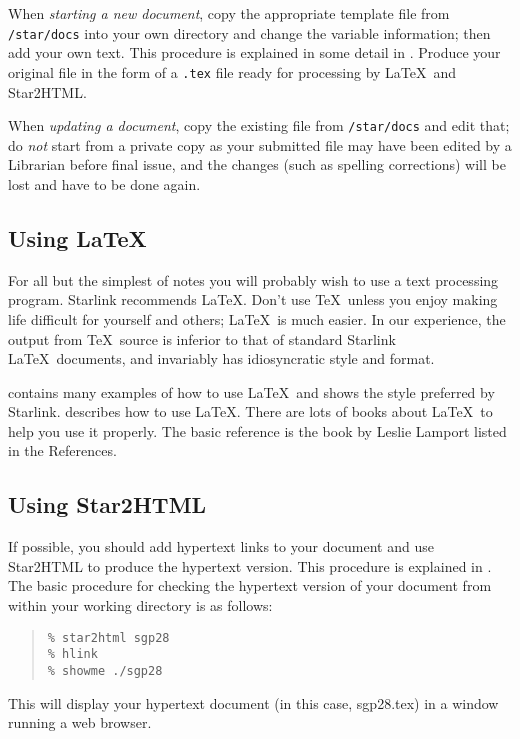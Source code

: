 \documentclass[twoside,11pt,nolof]{starlink}
\begin{document}
When \emph{starting a new document}, copy the appropriate template file from
\texttt{/star/docs}
into your own directory and change the variable information; then add your
own text.
This procedure is explained in some detail in
.
Produce your original file in the form of a \texttt{.tex} file ready for
processing by \LaTeX\ and Star2HTML.

When \emph{updating a document}, copy the existing file from \texttt{/star/docs}
and edit that; do \emph{not} start from a private copy as your submitted file
may have been edited by a Librarian before final issue, and the
changes (such as spelling corrections) will be lost and have to be done again.

\subsection{Using \LaTeX}

For all but the simplest of notes you will probably wish to use a text
processing program.
Starlink recommends {\LaTeX}.
Don't use \TeX\ unless you enjoy making life difficult for yourself and
others; \LaTeX\ is much easier.
In our experience, the output from \TeX\ source is inferior to that of
standard Starlink \LaTeX\ documents, and invariably has idiosyncratic style and
format.

contains many examples of how to use \LaTeX\ and shows the style preferred by
Starlink.
 describes how to use \LaTeX.
There are lots of books about \LaTeX\ to help you use it properly.
The basic reference is the book by Leslie Lamport listed in the References.

\subsection{Using Star2HTML}

If possible, you should add hypertext links to your document and use
Star2HTML to produce the hypertext version.
This procedure is explained in .
The basic procedure for checking the hypertext version of your document
from within your working directory is as follows:
\begin{quote}
\texttt{\% star2html sgp28\\
\% hlink\\
\% showme ./sgp28}
\end{quote}
This will display your hypertext document (in this case, sgp28.tex) in a window
running a web browser.
\end{document}
